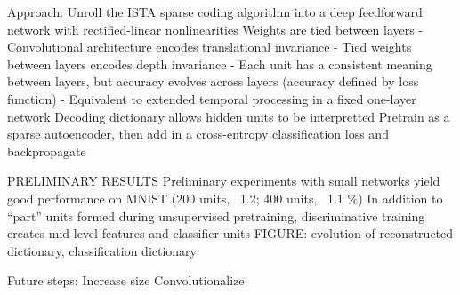 
Approach:
Unroll the ISTA sparse coding algorithm into a deep feedforward network with rectified-linear nonlinearities
Weights are tied between layers
  - Convolutional architecture encodes translational invariance
  - Tied weights between layers encodes depth invariance
  - Each unit has a consistent meaning between layers, but accuracy evolves across layers (accuracy defined by loss function)
  - Equivalent to extended temporal processing in a fixed one-layer network
Decoding dictionary allows hidden units to be interpretted
Pretrain as a sparse autoencoder, then add in a cross-entropy classification loss and backpropagate

PRELIMINARY RESULTS
Preliminary experiments with small networks yield good performance on MNIST (200 units, ~1.2; 400 units, ~1.1 \%)
In addition to ``part'' units formed during unsupervised pretraining, discriminative training  creates mid-level features and classifier units
FIGURE: evolution of reconstructed dictionary, classification dictionary

Future steps:
Increase size
Convolutionalize